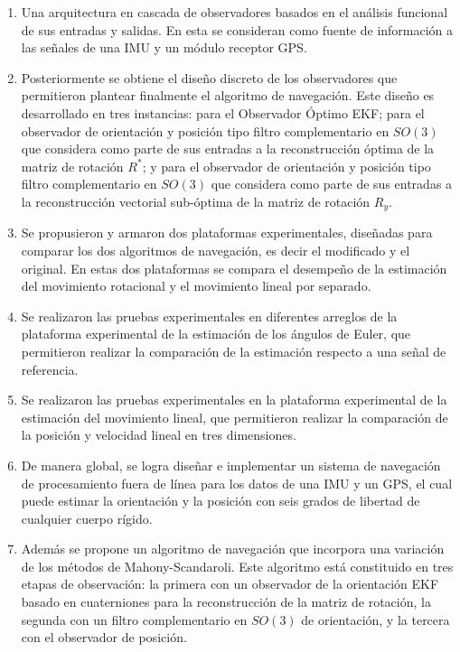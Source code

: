 \documentclass[10pt]{report}
\numberwithin{equation}{chapter}
\numberwithin{algorithm}{chapter}
\begin{document}
\begin{enumerate}
\item Una arquitectura en cascada de observadores basados en el análisis funcional de sus entradas y salidas. En esta se consideran como fuente de información a las señales de una IMU y un módulo receptor GPS. 
\item Posteriormente se obtiene el diseño discreto de los observadores que permitieron plantear finalmente el algoritmo de navegación. Este diseño es desarrollado en tres instancias: para el Observador Óptimo EKF; para el observador de orientación y posición tipo filtro complementario en $SO(3)$ que considera como parte de sus entradas a la reconstrucción óptima de la matriz de rotación $R^*$; y para el observador de orientación y posición tipo filtro complementario en $SO(3)$ que considera como parte de sus entradas a la reconstrucción vectorial sub-óptima de la matriz de rotación $R_y$.
\item Se propusieron y armaron dos plataformas experimentales, diseñadas para comparar los dos algoritmos de navegación, es decir el modificado y el original. En estas dos plataformas se compara el desempeño de la estimación del movimiento rotacional y el movimiento lineal por separado. 
\item Se realizaron las pruebas experimentales en diferentes arreglos de la plataforma experimental de la estimación de los ángulos de Euler, que permitieron realizar la comparación de la estimación respecto a una señal de referencia.
\item Se realizaron las pruebas experimentales en la plataforma experimental de la estimación del movimiento lineal, que permitieron realizar la comparación de la posición y velocidad lineal en tres dimensiones.
\item De manera global, se logra diseñar e implementar un sistema de navegación de procesamiento fuera de línea para los datos de una IMU y un GPS, el cual puede estimar la orientación y la posición con seis grados de libertad de cualquier cuerpo rígido.
\item Además se propone un algoritmo de navegación que incorpora una variación de los métodos de Mahony-Scandaroli. Este algoritmo está constituido en tres etapas de observación: la primera con un observador de la orientación EKF basado en cuaterniones para la reconstrucción de la matriz de rotación, la segunda con un filtro complementario en $SO(3)$ de orientación, y la tercera con el observador de posición.
\end{enumerate}
\end{document}
